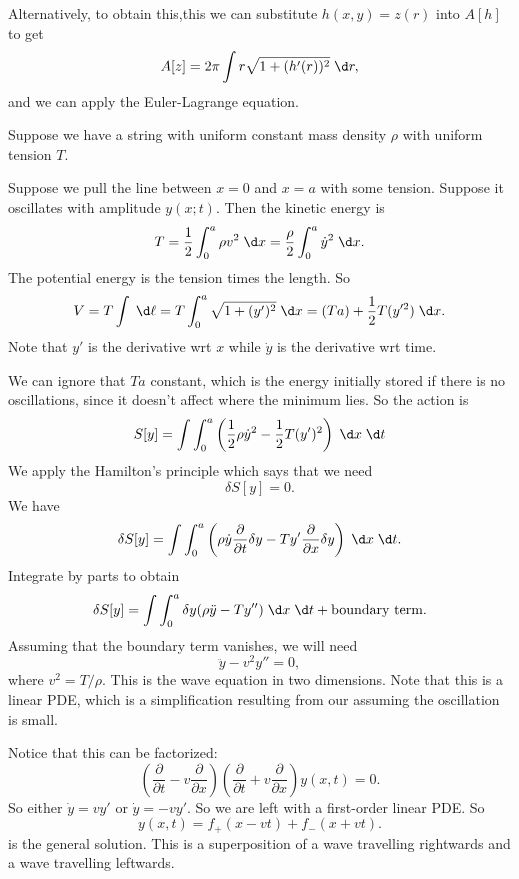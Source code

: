 \documentclass[a4paper]{article}
\begin{document}
\begin{eg}
\begin{itemize}
      Alternatively, to obtain this,this we can substitute $h(x, y) = z(r)$ into $A[h]$ to get
      \[
        A[z] = 2\pi \int r\sqrt{1 + (h'(r))^2}\;\d r,
      \]
      and we can apply the Euler-Lagrange equation.
  \end{itemize}
\end{eg}

\begin{eg}
  Suppose we have a string with uniform constant mass density $\rho$ with uniform tension $T$.
  \begin{center}
  \end{center}
  Suppose we pull the line between $x = 0$ and $x = a$ with some tension. Suppose it oscillates with amplitude $y(x; t)$.  Then the kinetic energy is
  \[
    T = \frac{1}{2}\int_0^a \rho v^2\;\d x = \frac{\rho}{2}\int_0^a \dot{y}^2 \;\d x.
  \]
  The potential energy is the tension times the length. So
  \[
    V = T\int \;\d \ell = T\int_0^a\sqrt{1 + (y')^2}\;\d x = (Ta) + \frac{1}{2}T(y'^2)\;\d x.
  \]
  Note that $y'$ is the derivative wrt $x$ while $\dot{y}$ is the derivative wrt time.

  We can ignore that $Ta$ constant, which is the energy initially stored if there is no oscillations, since it doesn't affect where the minimum lies. So the action is
  \[
    S[y] = \int \int_0^a \left(\frac{1}{2}\rho \dot{y}^2 - \frac{1}{2}T(y')^2\right)\;\d x\;\d t
  \]
  We apply the Hamilton's principle which says that we need
  \[
    \delta S[y] = 0.
  \]
  We have
  \[
    \delta S[y] = \int \int_0^a \left(\rho \dot{y} \frac{\partial}{\partial t}\delta y - Ty' \frac{\partial}{\partial x}\delta y\right)\;\d x\;\d t.
  \]
  Integrate by parts to obtain
  \[
    \delta S[y] = \int \int_0^a \delta y(\rho \ddot{y} - Ty'')\;\d x\;\d t + \text{boundary term}.
  \]
  Assuming that the boundary term vanishes, we will need
  \[
    \ddot{y} - v^2 y'' = 0,
  \]
  where $v^2 = T/\rho$. This is the wave equation in two dimensions. Note that this is a linear PDE, which is a simplification resulting from our assuming the oscillation is small.

  Notice that this can be factorized:
  \[
    \left(\frac{\partial}{\partial t} - v\frac{\partial}{\partial x}\right)\left(\frac{\partial}{\partial t} + v\frac{\partial}{\partial x}\right)y(x, t) = 0.
  \]
  So either $\dot y = vy'$ or $\dot y = -vy'$. So we are left with a first-order linear PDE. So
  \[
    y(x, t) = f_+(x - vt) + f_-(x + vt).
  \]
  is the general solution. This is a superposition of a wave travelling rightwards and a wave travelling leftwards.
\end{eg}
\end{document}

